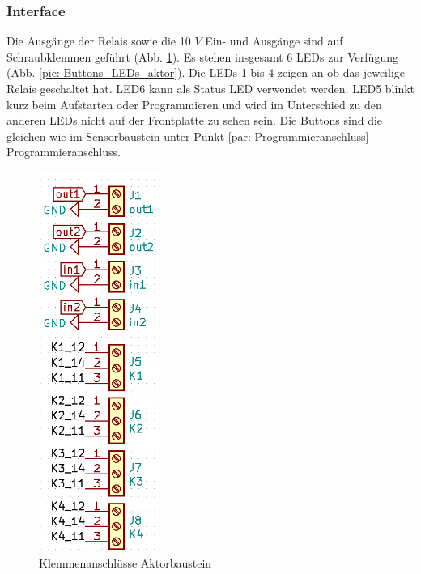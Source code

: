 \subsubsection{Interface}
Die Ausgänge der Relais sowie die 10 $V$ Ein- und Ausgänge sind auf Schraubklemmen geführt (Abb. \ref{pic: Klemmen_aktor}). Es stehen insgesamt 6 LEDs zur Verfügung (Abb. \ref{pic: Buttons_LEDs_aktor}). Die LEDs 1 bis 4 zeigen an ob das jeweilige Relais geschaltet hat. LED6 kann als Status LED verwendet werden. LED5 blinkt kurz beim Aufstarten oder Programmieren und wird im Unterschied zu den anderen LEDs nicht auf der Frontplatte zu sehen sein. Die Buttons sind die gleichen wie im Sensorbaustein unter Punkt \ref{par: Programmieranschluss} Programmieranschluss.
\begin{figure}[htb]
	\centering
	\begin{minipage}[t]{0.45\linewidth}
	\centering
	\includegraphics[width=0.35\textwidth]{graphics/shematics_aktor_klemmen.png}
	\caption{Klemmenanschlüsse Aktorbaustein}
	\label{pic: Klemmen_aktor}
	\end{minipage}%
	\hfill
	\begin{minipage}[t]{0.45\linewidth}
	\centering

\end{minipage}
\end{figure}

